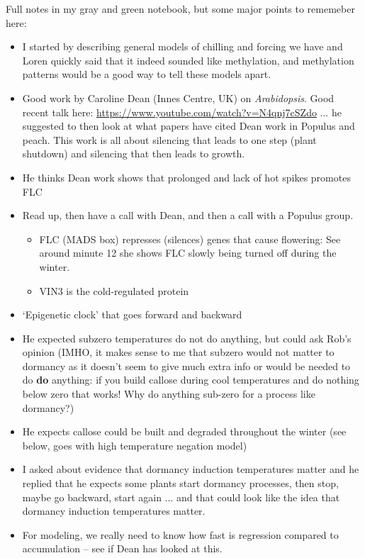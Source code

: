 \documentclass[11pt,letter]{article}
\begin{document}
Full notes in my gray and green notebook, but some major points to rememeber here:

\begin{itemize}
\item I started by describing general models of chilling and forcing we have and Loren quickly said that it indeed sounded like methylation, and  methylation patterns would be a good way to tell these models apart. 
\item Good work by Caroline Dean (Innes Centre, UK) on \emph{Arabidopsis}. Good recent talk here: \url{https://www.youtube.com/watch?v=N4qnj7cSZdo} ... he suggested to then look at what papers have cited Dean work in Populus and peach. This work is all about silencing that leads to one step (plant shutdown) and silencing that then leads to growth. 
\item He thinks Dean work shows that prolonged and lack of hot spikes promotes FLC
\item Read up, then have a call with Dean, and then a call with a Populus group. 
\begin{itemize}
\item FLC (MADS box) represses (silences) genes that cause flowering: See around minute 12 she shows FLC slowly being turned off during the winter. 
\item VIN3 is the cold-regulated protein
\end{itemize}
\item `Epigenetic clock' that goes forward and backward
\item He expected subzero temperatures do not do anything, but could ask Rob's opinion (IMHO, it makes sense to me that subzero would not matter to dormancy as it doesn't seem to give much extra info or would be needed to do {\bf do} anything: if you build callose during cool temperatures and do nothing below zero that works! Why do anything sub-zero for a process like dormancy?)
\item He expects callose could be built and degraded throughout the winter (see below, goes with high temperature negation model)
\item I asked about evidence that dormancy induction temperatures matter and he replied that he expects some plants start dormancy processes, then stop, maybe go backward, start again ... and that could look like the idea that dormancy induction temperatures matter. 
\item For modeling, we really need to know how fast is regression compared to accumulation -- see if Dean has looked at this. 
\end{itemize}
\end{document}
